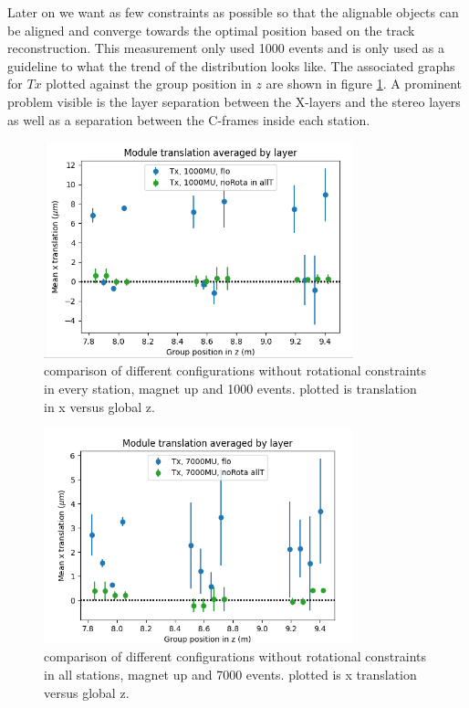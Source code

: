 Later on we want as few constraints as possible so that the alignable objects can be aligned and converge towards the optimal position based on the track reconstruction.
This measurement only used 1000 events and is only used as a guideline to what the trend of the distribution looks like. The associated graphs for $Tx$ plotted against the group position in $z$ are shown in figure \ref{fig:june_2}.
A prominent problem visible is the layer separation between the X-layers and the stereo layers as well as a separation between the C-frames inside each station.

\begin{figure}
  \centering
  \includegraphics[width=0.8\textwidth]{plots/june_21/Tx_noRota_allT_1000MU.png}
  \caption{comparison of different configurations without rotational constraints in every station, magnet up and 1000 events. plotted is translation in x versus global z.}
  \label{fig:june_2}
\end{figure}

\begin{figure}
  \centering
  \includegraphics[width=0.8\textwidth]{plots/june_21/Tx_noRota_allT_7000MU.png}
  \caption{comparison of different configurations without rotational constraints in all stations, magnet up and 7000 events. plotted is x translation versus global z.}
  \label{fig:june_2_1}
\end{figure}

